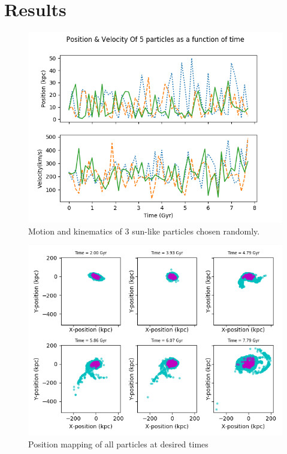 \documentclass[iop]{emulateapj}
\begin{document}
\section{Results}
    
    
    \begin{figure}[h]
        \centering
        \includegraphics[width=\columnwidth]{trajectory}
        \caption{Motion and kinematics of 3 sun-like particles chosen randomly.}
        \label{fig:separation}
    \end{figure}
    
    \begin{figure}[h]
        \centering
        \includegraphics[width=\columnwidth]{snapshots}
        \caption{Position mapping of all particles at desired times}
        \label{fig:separation}
    \end{figure}
    
\end{document}
